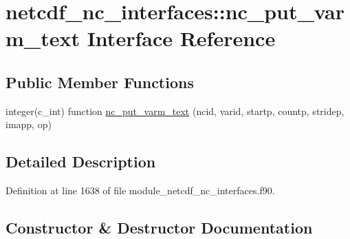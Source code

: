 \hypertarget{interfacenetcdf__nc__interfaces_1_1nc__put__varm__text}{}\section{netcdf\+\_\+nc\+\_\+interfaces\+:\+:nc\+\_\+put\+\_\+varm\+\_\+text Interface Reference}
\label{interfacenetcdf__nc__interfaces_1_1nc__put__varm__text}
\subsection*{Public Member Functions}
\begin{DoxyCompactItemize}
\item 
integer(c\+\_\+int) function \hyperlink{interfacenetcdf__nc__interfaces_1_1nc__put__varm__text_a5698fe927911b48922732c6bb461780d}{nc\+\_\+put\+\_\+varm\+\_\+text} (ncid, varid, startp, countp, stridep, imapp, op)
\end{DoxyCompactItemize}


\subsection{Detailed Description}


Definition at line 1638 of file module\+\_\+netcdf\+\_\+nc\+\_\+interfaces.\+f90.



\subsection{Constructor \& Destructor Documentation}
\mbox{\label{interfacenetcdf__nc__interfaces_1_1nc__put__varm__text_a5698fe927911b48922732c6bb461780d}} 
